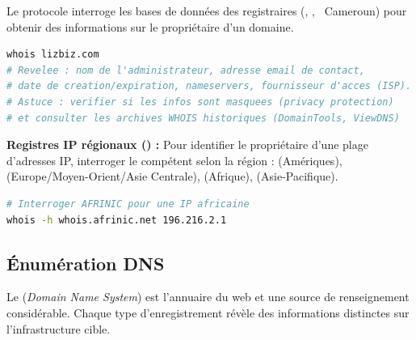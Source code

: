 Le protocole  interroge les bases de données des registraires
(, , ~Cameroun) pour obtenir des
informations sur le propriétaire d'un domaine.

\begin{lstlisting}[language=bash, caption={Requête Whois, informations registraire}]
whois lizbiz.com
# Revelee : nom de l'administrateur, adresse email de contact,
# date de creation/expiration, nameservers, fournisseur d'acces (ISP).
# Astuce : verifier si les infos sont masquees (privacy protection)
# et consulter les archives WHOIS historiques (DomainTools, ViewDNS)
\end{lstlisting}

\begin{boxinfo}
\textbf{Registres IP régionaux () :} Pour identifier le propriétaire
d'une plage d'adresses IP, interroger le  compétent selon la région :
 (Amériques),  (Europe/Moyen-Orient/Asie Centrale),
 (Afrique),  (Asie-Pacifique).
\begin{lstlisting}[language=bash]
# Interroger AFRINIC pour une IP africaine
whois -h whois.afrinic.net 196.216.2.1
\end{lstlisting}
\end{boxinfo}

\subsection{Énumération DNS}
\label{subsec:dns_enum}

Le  (\textit{Domain Name System}) est l'annuaire du web et une
source de renseignement considérable. Chaque type d'enregistrement révèle
des informations distinctes sur l'infrastructure cible.

